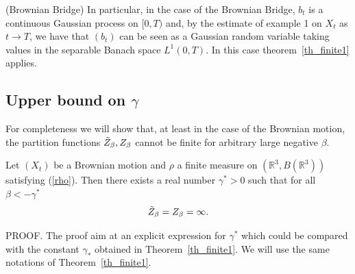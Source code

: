 \begin{example}
\label{example_of_brownian_bridge}
(Brownian Bridge) In particular, in the case of the Brownian Bridge, 
$b_t$ is a continuous Gaussian process on $[0,T)$ and, by the estimate
of example 1 on
$X_t$ as $t \to T$, we have that $(b_t)$ can be seen as a Gaussian random
variable taking values in the separable Banach space $L^1(0,T)$.
In this case theorem~\ref{th_finite1} applies.
\end{example}


\subsection{Upper bound on $\gamma$}

For completeness we will show that, at least in the case of the Brownian
motion, the partition functions $\Tilde{Z}_{\beta},
Z_\beta$ cannot be finite for arbitrary large negative $\beta$.

\begin{theorem}
Let $( X_{t}) $ be a Brownian motion 
and $\rho $ a finite measure on $( \mathbb{R}^{3},B( 
\mathbb{R}^{3})) $ satisfying (\ref{rho}). Then there exists 
a real number $\gamma^* > 0$ such that for all  $\beta < -\gamma^*$
\begin{equation*}
\Tilde{Z}_\beta =  Z_\beta = \infty. 
\end{equation*}
\end{theorem}

PROOF. 
The proof aim at an explicit expression for $\gamma^*$ which could be
compared with the constant $\gamma_*$ obtained in Theorem~\ref{th_finite1}.
We will use the same notations of Theorem~\ref{th_finite1}.

